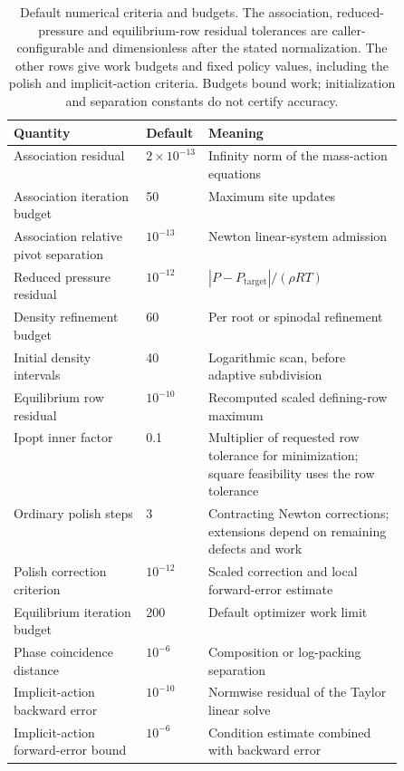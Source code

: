 \begin{table}[pos=htbp]
\centering\small
\caption{Default numerical criteria and budgets. The association, reduced-pressure and equilibrium-row residual tolerances are caller-configurable and dimensionless after the stated normalization. The other rows give work budgets and fixed policy values, including the polish and implicit-action criteria. Budgets bound work; initialization and separation constants do not certify accuracy.}
\label{tab:defaults}
\begin{tabularx}{\linewidth}{@{}p{0.34\linewidth}p{0.16\linewidth}X@{}}
\toprule
Quantity & Default & Meaning \\
\midrule
Association residual & $2\times10^{-13}$ & Infinity norm of the mass-action equations \\
Association iteration budget & 50 & Maximum site updates \\
Association relative pivot separation & $10^{-13}$ & Newton linear-system admission \\
Reduced pressure residual & $10^{-12}$ & $|P-P_{\mathrm{target}}|/(\rho RT)$ \\
Density refinement budget & 60 & Per root or spinodal refinement \\
Initial density intervals & 40 & Logarithmic scan, before adaptive subdivision \\
Equilibrium row residual & $10^{-10}$ & Recomputed scaled defining-row maximum \\
Ipopt inner factor & 0.1 & Multiplier of requested row tolerance for minimization; square feasibility uses the row tolerance \\
Ordinary polish steps & 3 & Contracting Newton corrections; extensions depend on remaining defects and work \\
Polish correction criterion & $10^{-12}$ & Scaled correction and local forward-error estimate \\
Equilibrium iteration budget & 200 & Default optimizer work limit \\
Phase coincidence distance & $10^{-6}$ & Composition or log-packing separation \\
Implicit-action backward error & $10^{-10}$ & Normwise residual of the Taylor linear solve \\
Implicit-action forward-error bound & $10^{-6}$ & Condition estimate combined with backward error \\
\bottomrule
\end{tabularx}
\end{table}

